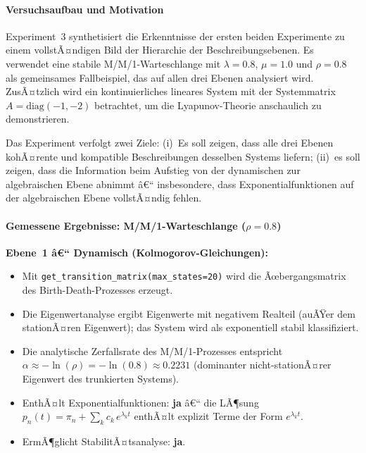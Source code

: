 ﻿\documentclass[a4paper,12pt]{report}
\theoremstyle{definition}
\begin{document}
\paragraph{Versuchsaufbau und Motivation}

Experiment~3 synthetisiert die Erkenntnisse der ersten beiden
Experimente zu einem vollstÃ¤ndigen Bild der Hierarchie der
Beschreibungsebenen.  Es verwendet eine stabile M/M/1-Warteschlange
mit $\lambda = 0.8$, $\mu = 1.0$ und $\rho = 0.8$ als gemeinsames
Fallbeispiel, das auf allen drei Ebenen analysiert wird.  ZusÃ¤tzlich
wird ein kontinuierliches lineares System mit der Systemmatrix
$A = \text{diag}(-1, -2)$ betrachtet, um die Lyapunov-Theorie
anschaulich zu demonstrieren.

Das Experiment verfolgt zwei Ziele: (i)~Es soll zeigen, dass alle drei
Ebenen kohÃ¤rente und kompatible Beschreibungen desselben Systems
liefern; (ii)~es soll zeigen, dass die Information beim Aufstieg von
der dynamischen zur algebraischen Ebene abnimmt â€“ insbesondere, dass
Exponentialfunktionen auf der algebraischen Ebene vollstÃ¤ndig fehlen.

\paragraph{Gemessene Ergebnisse: M/M/1-Warteschlange ($\rho = 0.8$)}

\textbf{Ebene~1 â€“ Dynamisch (Kolmogorov-Gleichungen):}
\begin{itemize}
	\item Mit \texttt{get\_transition\_matrix(max\_states=20)} wird die Ãœbergangsmatrix des Birth-Death-Prozesses erzeugt.
	\item Die Eigenwertanalyse ergibt Eigenwerte mit negativem Realteil
	(auÃŸer dem stationÃ¤ren Eigenwert); das System wird als
	exponentiell stabil klassifiziert.
	\item Die analytische Zerfallsrate des M/M/1-Prozesses entspricht
	$\alpha \approx -\ln(\rho) = -\ln(0.8) \approx 0.2231$
	(dominanter nicht-stationÃ¤rer Eigenwert des trunkierten
	Systems).
	\item EnthÃ¤lt Exponentialfunktionen: \textbf{ja} â€“ die LÃ¶sung
	$p_n(t) = \pi_n + \sum_k c_k\,e^{\lambda_k t}$ enthÃ¤lt
	explizit Terme der Form $e^{\lambda_k t}$.
	\item ErmÃ¶glicht StabilitÃ¤tsanalyse: \textbf{ja}.
\end{itemize}
\end{document}
